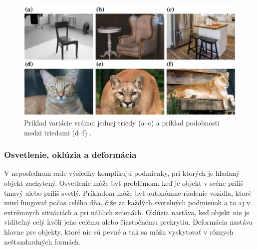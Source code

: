 \begin{figure}[ht]
    \centering
    \includegraphics[width=1\textwidth]{images/02/challenge2.png}
    \caption{Príklad variácie vrámci jednej triedy (a–c) a príklad podobnosti medzi triedami (d–f) \cite{RosinPaulL2019RIAa}.}
    \label{img:ch2}
\end{figure}

\subsubsection{Osvetlenie, oklúzia a deformácia}
V neposlednom rade výsledky komplikujú podmienky, pri ktorých je hľadaný objekt zachytený. Osvetlenie môže byť problémom, keď je objekt v scéne príliš tmavý alebo príliš svetlý. Príkladom môže byť autonómne riadenie vozidla, ktoré musí fungovať počas celého dňa, čiže za každých svetelných podmienok a to aj v extrémnych situáciách a pri náhlich zmenách. Oklúzia nastáva, keď objekt nie je viditeľný celý kvôli jeho celému alebo čiastočnému prekrytiu. Deformácia nastáva hlavne pre objekty, ktoré nie sú pevné a tak sa môžu vyskytovať v rôznych neštandardných formách.
